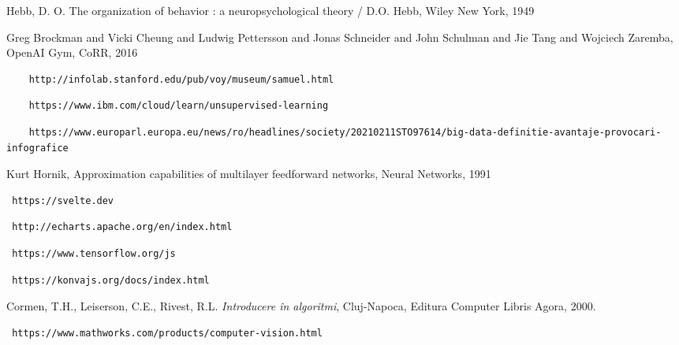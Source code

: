 


\begin{thebibliography}{99}

 Hebb, D. O.  The organization of behavior : a neuropsychological theory / D.O. Hebb, Wiley New York, 1949

 Greg Brockman and Vicki Cheung and Ludwig Pettersson and Jonas Schneider and John Schulman and Jie Tang and Wojciech Zaremba, OpenAI Gym, CoRR, 2016

 \begin{verbatim}
	http://infolab.stanford.edu/pub/voy/museum/samuel.html
\end{verbatim}

 \begin{verbatim}
	https://www.ibm.com/cloud/learn/unsupervised-learning
\end{verbatim}

 \begin{verbatim}
	https://www.europarl.europa.eu/news/ro/headlines/society/20210211STO97614/big-data-definitie-avantaje-provocari-infografice
\end{verbatim}

 Kurt Hornik, Approximation capabilities of multilayer feedforward networks, Neural Networks, 1991

 \begin{verbatim} https://svelte.dev 
\end{verbatim}

 \begin{verbatim} http://echarts.apache.org/en/index.html 
\end{verbatim}

 \begin{verbatim} https://www.tensorflow.org/js 
\end{verbatim}

 \begin{verbatim} https://konvajs.org/docs/index.html
\end{verbatim}




 Cormen,  T.H.,  Leiserson,  C.E.,  Rivest,  R.L. \textit{Introducere \^ in algoritmi}, Cluj-Napoca, Editura Computer Libris Agora, 2000.

 \begin{verbatim} https://www.mathworks.com/products/computer-vision.html
\end{verbatim}


\end{thebibliography}

